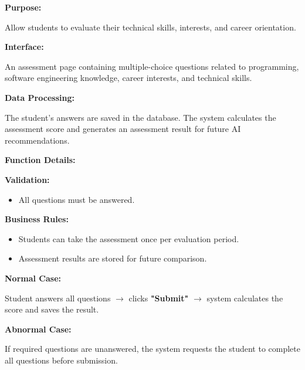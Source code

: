 \vspace{0.2cm}

\textbf{Purpose:}

Allow students to evaluate their technical skills, interests, and career orientation.

\vspace{0.2cm}

\textbf{Interface:}

An assessment page containing multiple-choice questions related to programming, software engineering knowledge, career interests, and technical skills.

\vspace{0.2cm}

\textbf{Data Processing:}

The student's answers are saved in the database. The system calculates the assessment score and generates an assessment result for future AI recommendations.

\vspace{0.3cm}

\textbf{Function Details:}

\textbf{Validation:}

\begin{itemize}
\item All questions must be answered.
\end{itemize}

\textbf{Business Rules:}

\begin{itemize}
\item Students can take the assessment once per evaluation period.
\item Assessment results are stored for future comparison.
\end{itemize}

\textbf{Normal Case:}

Student answers all questions $\rightarrow$ clicks \textbf{"Submit"} $\rightarrow$ system calculates the score and saves the result.

\textbf{Abnormal Case:}

If required questions are unanswered, the system requests the student to complete all questions before submission.

%

